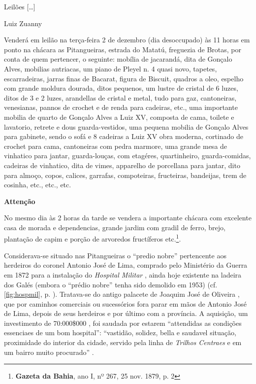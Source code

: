 \begin{citacao}
Leilões [\dots]

Luiz Zuanny 

Venderá em leilão na terça-feira 2 de dezembro (dia desoccupado) às 11 horas em ponto na chácara as Pitangueiras, estrada do Matatú, freguezia de Brotas, por conta de quem pertencer, o seguinte: mobília de jacarandá, dita de Gonçalo Alves, mobilias autriacas, um piano de Pleyel n. 4 quasi novo, tapetes, escarradeiras, jarras finas de Bacarat, figura de Biscuit, quadros a oleo, espelho com grande moldura dourada, ditos pequenos, um lustre de cristal de 6 luzes, ditos de 3 e 2 luzes, arandellas de cristal e metal, tudo para gaz, cantoneiras, venesianas, pannos de crochet e de renda para cadeiras, etc., uma importante mobilia de quarto de Gonçalo Alves a Luiz XV, composta de cama, toilete e lavatorio, retrete e dous guarda-vestidos, uma pequena mobilia de Gonçalo Alves para gabinete, sendo o sofá e 8 cadeiras a Luiz XV obra moderna, cortinado de crochet para cama, cantoneiras com pedra marmore, uma grande mesa de vinhatico para jantar, guarda-louças, com etagéres, quartinheiro, guarda-comidas, cadeiras de vinhatico, dita de vimes, apparelho de porcellana para jantar, dito para almoço, copos, calices, garrafas, compoteiras, fructeiras, bandeijas, trem de cosinha, etc., etc., etc.

\textbf{Attenção}

No mesmo dia às 2 horas da tarde se vendera a importante chácara com excelente casa de morada e dependencias, grande jardim com gradil de ferro, brejo, plantação de capim e porção de arvoredos fructíferos etc.\footnote{\textbf{Gazeta da Bahia}, ano I, nº 267, 25 nov. 1879, p. 2}.
\end{citacao}

Considerava-se situado nas Pitangueiras o ``predio nobre'' pertencente aos herdeiros do coronel Antonio José de Lima, comprado pelo Ministério da Guerra em 1872 para a instalação do \textit{Hospital Militar} \cite[p.~30]{bahia_1872}, ainda hoje existente na ladeira dos Galés (embora o ``prédio nobre'' tenha sido demolido em 1953) (cf. \autoref{fig:hospmil}, p. \pageref{fig:hospmil}). Tratava-se do antigo palacete de Joaquim José de Oliveira \cite[p.~36]{bahia_rpe_1874}, que por caminhos comerciais ou sucessórios fora parar em mãos de Antonio José de Lima, depois de seus herdeiros e por último com a província. A aquisição, um investimento de 70:000\$000 \cite[p.~10]{bahia_1872}, foi saudada por estarem ``attendidas as condições essenciaes de um bom hospital'': ``vastidão, solidez, bella e saudavel situação, proximidade do interior da cidade, servido pela linha de \textit{Trilhos Centraes} e em um bairro muito procurado'' \cite[p.~31]{bahia_1872}.

